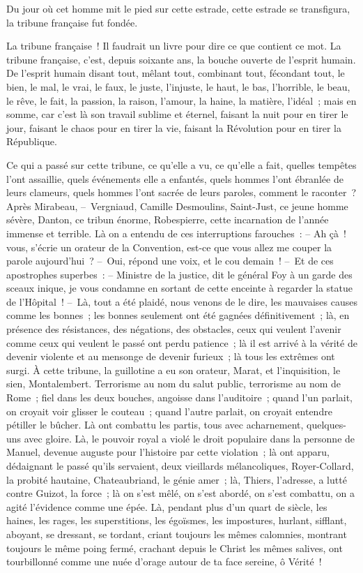 \documentclass[french,twoside]{book} %
\begin{document}
\noindent Du jour où cet homme mit le pied sur cette estrade, cette estrade se transfigura, la tribune française fut fondée.\par
La tribune française ! Il faudrait un livre pour dire ce que contient ce mot. La tribune française, c’est, depuis soixante ans, la bouche ouverte de l’esprit humain. De l’esprit humain disant tout, mêlant tout, combinant tout, fécondant tout, le bien, le mal, le vrai, le faux, le juste, l’injuste, le haut, le bas, l’horrible, le beau, le rêve, le fait, la passion, la raison, l’amour, la haine, la matière, l’idéal ; mais en somme, car c’est là son travail sublime et éternel, faisant la nuit pour en tirer le jour, faisant le chaos pour en tirer la vie, faisant la Révolution pour en tirer la République.\par
Ce qui a passé sur cette tribune, ce qu’elle a vu, ce qu’elle a fait, quelles tempêtes l’ont assaillie, quels événements elle a enfantés, quels hommes l’ont ébranlée de leurs clameurs, quels hommes l’ont sacrée de leurs paroles, comment le raconter ? Après Mirabeau, – Vergniaud, Camille Desmoulins, Saint-Just, ce jeune homme sévère, Danton, ce tribun énorme, Robespierre, cette incarnation de l’année immense et terrible. Là on a entendu de ces interruptions farouches : – Ah çà ! vous, s’écrie un orateur de la Convention, est-ce que vous allez me couper la parole aujourd’hui ? – Oui, répond une voix, et le cou demain ! – Et de ces apostrophes superbes : – Ministre de la justice, dit le général Foy à un garde des sceaux inique, je vous condamne en sortant de cette enceinte à regarder la statue de l’Hôpital ! – Là, tout a été plaidé, nous venons de le dire, les mauvaises causes comme les bonnes ; les bonnes seulement ont été gagnées définitivement ; là, en présence des résistances, des négations, des obstacles, ceux qui veulent l’avenir comme ceux qui veulent le passé ont perdu patience ; là il est arrivé à la vérité de devenir violente et au mensonge de devenir furieux ; là tous les extrêmes ont surgi. À cette tribune, la guillotine a eu son orateur, Marat, et l’inquisition, le sien, Montalembert. Terrorisme au nom du salut public, terrorisme au nom de Rome ; fiel dans les deux bouches, angoisse dans l’auditoire ; quand l’un parlait, on croyait voir glisser le couteau ; quand l’autre parlait, on croyait entendre pétiller le bûcher. Là ont combattu les partis, tous avec acharnement, quelques-uns avec gloire. Là, le pouvoir royal a violé le droit populaire dans la personne de Manuel, devenue auguste pour l’histoire par cette violation ; là ont apparu, dédaignant le passé qu’ils servaient, deux vieillards mélancoliques, Royer-Collard, la probité hautaine, Chateaubriand, le génie amer ; là, Thiers, l’adresse, a lutté contre Guizot, la force ; là on s’est mêlé, on s’est abordé, on s’est combattu, on a agité l’évidence comme une épée. Là, pendant plus d’un quart de siècle, les haines, les rages, les superstitions, les égoïsmes, les impostures, hurlant, sifflant, aboyant, se dressant, se tordant, criant toujours les mêmes calomnies, montrant toujours le même poing fermé, crachant depuis le Christ les mêmes salives, ont tourbillonné comme une nuée d’orage autour de ta face sereine, ô Vérité !
\end{document}
